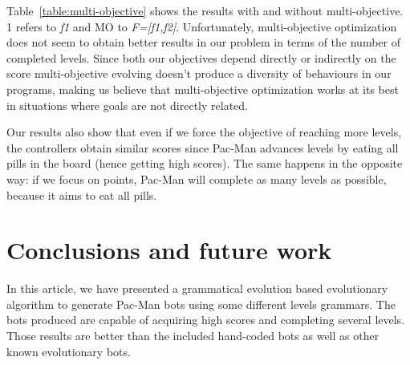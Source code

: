 \documentclass{llncs}
\newcommand{\paco}{Pac-Man }
\begin{document}
Table~\ref{table:multi-objective} shows the results with and without multi-objective. 1 refers to \textit{f1} and MO to {\textit{F=[f1,f2]}}. Unfortunately, multi-objective optimization does not seem to obtain better results in our problem in terms of the number of completed levels. Since both our objectives depend directly or indirectly on the score multi-objective evolving doesn't produce a diversity of behaviours in our programs, making us believe that multi-objective optimization works at its best in situations where goals are not directly related. 

Our results also show that even if we force the objective of reaching more levels, the controllers obtain similar scores since \paco advances levels by eating all pills in the board (hence getting high scores). The same happens in the opposite way: if we focus on points, \paco will complete as many levels as possible, because it aims to eat all pills.


%
\section{Conclusions and future work}
\label{sec:conclusions}
%
In this article, we have presented a grammatical evolution based evolutionary algorithm to generate Pac-Man bots using some different levels grammars. The bots produced are capable of acquiring high scores and completing several levels. Those results are better than the included hand-coded bots as well as other known evolutionary bots\cite{galvan2010evolving}.
\end{document}
